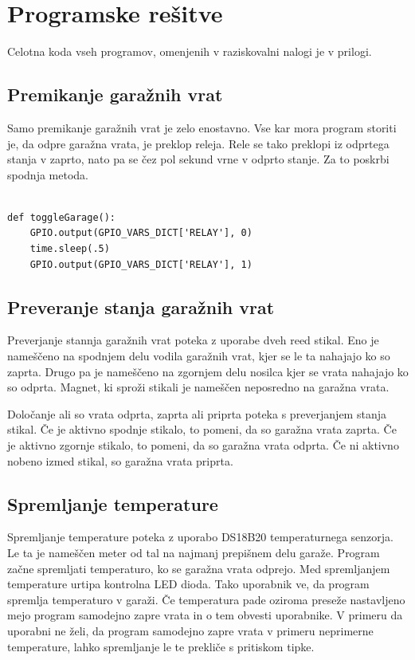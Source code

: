 \documentclass[11pt]{article}
\begin{document}
\section{Programske rešitve}
Celotna koda vseh programov, omenjenih v raziskovalni nalogi je v prilogi.
\subsection{Premikanje garažnih vrat}
Samo premikanje garažnih vrat je zelo enostavno. Vse kar mora program storiti je, da odpre garažna vrata, je preklop releja. Rele se tako preklopi iz odprtega stanja v zaprto, nato pa se čez pol sekund vrne v odprto stanje. Za to poskrbi spodnja metoda.
\begin{verbatim}

def toggleGarage():
    GPIO.output(GPIO_VARS_DICT['RELAY'], 0)
    time.sleep(.5)
    GPIO.output(GPIO_VARS_DICT['RELAY'], 1)
\end{verbatim}
\subsection{Preveranje stanja garažnih vrat}
Preverjanje stannja garažnih vrat poteka z uporabe dveh reed stikal. Eno je nameščeno na spodnjem delu vodila garažnih vrat, kjer se le ta nahajajo ko so zaprta. Drugo pa je nameščeno na zgornjem delu nosilca kjer se vrata nahajajo ko so odprta. Magnet, ki sproži stikali je nameščen neposredno na garažna vrata.

Določanje ali so vrata odprta, zaprta ali priprta poteka s preverjanjem stanja stikal. Če je aktivno spodnje stikalo, to pomeni, da so garažna vrata zaprta. Če je aktivno zgornje stikalo, to pomeni, da so garažna vrata odprta. Če ni aktivno nobeno izmed stikal, so garažna vrata priprta.

\subsection{Spremljanje temperature}
Spremljanje temperature poteka z uporabo DS18B20 temperaturnega senzorja. Le ta je nameščen meter od tal na najmanj prepišnem delu garaže. Program začne spremljati temperaturo, ko se garažna vrata odprejo. Med spremljanjem temperature urtipa kontrolna LED dioda. Tako uporabnik ve, da program spremlja temperaturo v garaži. Če temperatura pade oziroma preseže nastavljeno mejo program samodejno zapre vrata in o tem obvesti uporabnike. V primeru da uporabni ne želi, da program samodejno zapre vrata v primeru neprimerne temperature, lahko spremljanje le te prekliče s pritiskom tipke.
\end{document}

